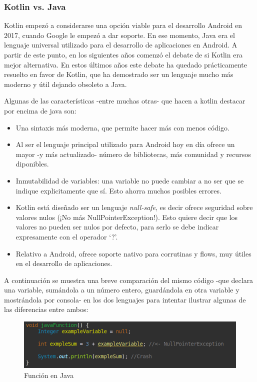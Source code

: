 \subsubsection{Kotlin vs. Java}
\label{subsec:kotlinvsjava}
Kotlin empezó a considerarse una opción viable para el desarrollo Android en 2017, cuando Google le empezó a dar soporte. En ese momento, Java era el lenguaje universal utilizado para el desarrollo de aplicaciones en Android. A partir de este punto, en los siguientes años comenzó el debate de si Kotlin era mejor alternativa. En estos últimos años este debate ha quedado prácticamente resuelto en favor de Kotlin, que ha demostrado ser un lenguaje mucho más moderno y útil dejando obsoleto a Java.

Algunas de las características -entre muchas otras- que hacen a kotlin destacar por encima de java son:
\begin{itemize}
    \item Una sintaxis más moderna, que permite hacer más con menos código.
    \item Al ser el lenguaje principal utilizado para Android hoy en día ofrece un mayor -y más actualizado- número de bibliotecas, más comunidad y recursos diponibles.
    \item Inmutabilidad de variables: una variable no puede cambiar a no ser que se indique explicitamente que sí. Esto ahorra muchos posibles errores.
    \item Kotlin está diseñado ser un lenguaje \textit{null-safe}, es decir ofrece seguridad sobre valores nulos (¡No más NullPointerException!). Esto quiere decir que los valores no pueden ser nulos por defecto, para serlo se debe indicar expresamente con el operador ‘?’.
    \item Relativo a Android, ofrece soporte nativo para corrutinas y flows, muy útiles en el desarrollo de aplicaciones.
\end{itemize}
A continuación se muestra una breve comparación del mismo código -que declara una variable, sumándola a un número entero, guardándola en otra variable y mostrándola por consola- en los dos lenguajes para intentar ilustrar algunas de las diferencias entre ambos:
\begin{figure}[h]
	\centering
	\includegraphics[width = 1\textwidth]{Imagenes/Fuentes/javaFun.png}
	\caption{Función en Java}
	\label{fig:javaFun}
\end{figure}
